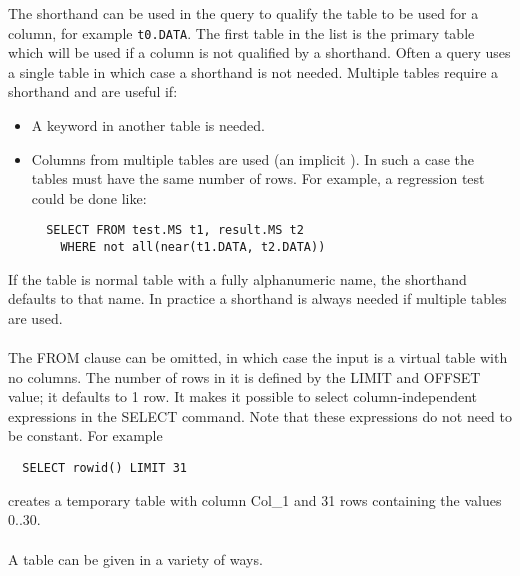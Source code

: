 The shorthand can be used in
the query to qualify the table to be used for a column, for example
{\tt t0.DATA}. The first
table in the list is the primary table which will be used if a column
is not qualified by a shorthand.
Often a query uses a single table in which case a shorthand is not
needed. Multiple tables require a shorthand and are useful if:
\begin{itemize}
  \item A keyword in another table is needed.
  \item Columns from multiple tables are used (an implicit
    ). In such a case the tables must have
    the same number of rows. For example, a regression test could be
    done like:
\begin{verbatim}
  SELECT FROM test.MS t1, result.MS t2
    WHERE not all(near(t1.DATA, t2.DATA))
\end{verbatim}
\end{itemize}
If the table is normal table with a fully alphanumeric name, the shorthand defaults to
that name. In practice a shorthand is always needed if multiple tables
are used. 

\paragraph*{}
The FROM clause can be omitted, in which case the input is a virtual
table with no columns. The number of rows in it is defined by the
LIMIT and OFFSET value; it defaults to 1 row. It makes it possible to select
column-independent expressions in the SELECT command. Note that these
expressions do not need to be constant. For example
\begin{verbatim}
  SELECT rowid() LIMIT 31
\end{verbatim}
creates a temporary table with column Col\_1 and 31 rows containing the
values 0..30. 

\paragraph*{}
A table can be given in a variety of ways.

